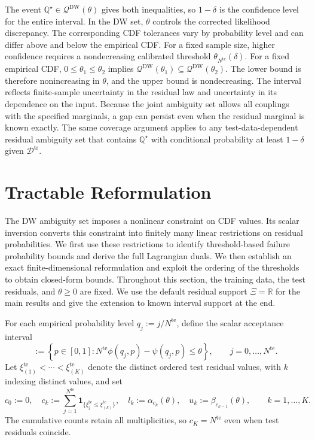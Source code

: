 \documentclass[review,11pt,3p,authoryear,nopreprintline]{elsarticle}
\begin{document}
The event $\mathbb Q^\star\in\mathcal Q^{\mathrm{DW}}(\theta)$ gives both inequalities, so $1-\delta$ is the confidence level for the entire interval. In the DW set, $\theta$ controls the corrected likelihood discrepancy. The corresponding CDF tolerances vary by probability level and can differ above and below the empirical CDF. For a fixed sample size, higher confidence requires a nondecreasing calibrated threshold $\theta_{N^{\mathrm{te}}}(\delta)$. For a fixed empirical CDF, $0\le\theta_1\le\theta_2$ implies $\mathcal Q^{\mathrm{DW}}(\theta_1)\subseteq\mathcal Q^{\mathrm{DW}}(\theta_2)$. The lower bound is therefore nonincreasing in $\theta$, and the upper bound is nondecreasing. The interval reflects finite-sample uncertainty in the residual law and uncertainty in its dependence on the input. Because the joint ambiguity set allows all couplings with the specified marginals, a gap can persist even when the residual marginal is known exactly. The same coverage argument applies to any test-data-dependent residual ambiguity set that contains $\mathbb Q^\star$ with conditional probability at least $1-\delta$ given $\mathcal D^{\mathrm{tr}}$.


\section{Tractable Reformulation}
\label{sec-reformulation}

The DW ambiguity set imposes a nonlinear constraint on CDF values. Its scalar inversion converts this constraint into finitely many linear restrictions on residual probabilities. We first use these restrictions to identify threshold-based failure probability bounds and derive the full Lagrangian duals. We then establish an exact finite-dimensional reformulation and exploit the ordering of the thresholds to obtain closed-form bounds. Throughout this section, the training data, the test residuals, and $\theta\ge0$ are fixed. We use the default residual support $\Xi=\mathbb R$ for the main results and give the extension to known interval support at the end.

For each empirical probability level $q_j:=j/N^{\mathrm{te}}$, define the scalar acceptance interval
\begin{equation}
  [\alpha_j(\theta),\beta_j(\theta)]
  :=\left\{p\in[0,1]:
  N^{\mathrm{te}}\phi(q_j,p)-\psi(q_j,p)\le\theta\right\},
  \qquad j=0,\ldots,N^{\mathrm{te}}.
  \label{eq-dw-rank-acceptance}
\end{equation}
Let $\xi_{(1)}^{\mathrm{te}}<\cdots<\xi_{(K)}^{\mathrm{te}}$ denote the distinct ordered test residual values, with $k$ indexing distinct values, and set
\begin{equation} 
    c_0 :=0, \quad
    c_k :=\sum_{j=1}^{N^{\mathrm{te}}}\mathbf1_{\{\xi_j^{\mathrm{te}}\le\xi_{(k)}^{\mathrm{te}}\}}, \quad
    l_k :=\alpha_{c_k}(\theta),  \quad
    u_k :=\beta_{c_{k-1}}(\theta),\qquad k=1,\ldots,K. 
  \label{eq-dw-counts-and-levels}
\end{equation}
The cumulative counts retain all multiplicities, so $c_K=N^{\mathrm{te}}$ even when test residuals coincide.
\end{document}
